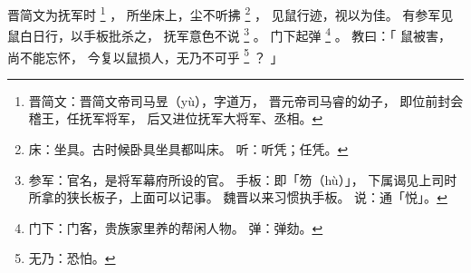 
\switchcolumn*[\section{}]

晋简文为抚军时%
\footnote{%
    晋简文：晋简文帝司马昱（yù），字道万，
            晋元帝司马睿的幼子，
            即位前封会稽王，任抚军将军，
            后又进位抚军大将军、丞相。
}%
，
所坐床上，尘不听拂%
\footnote{%
    床：坐具。古时候卧具坐具都叫床。
    听：听凭；任凭。
}%
，
见鼠行迹，视以为佳。
有参军见鼠白日行，以手板批杀之，
抚军意色不说%
\footnote{%
    参军：官名，是将军幕府所设的官。
    手板：即「笏（hù）」，
          下属谒见上司时所拿的狭长板子，上面可以记事。
          魏晋以来习惯执手板。
    说：通「悦」。
}%
。
门下起弹%
\footnote{%
    门下：门客，贵族家里养的帮闲人物。
    弹：弹劾。
}%
。
教曰：「
    鼠被害，
    尚不能忘怀，
    今复以鼠损人，无乃不可乎%
    \footnote{%
        无乃：恐怕。
    }%
    ？
」

\switchcolumn



